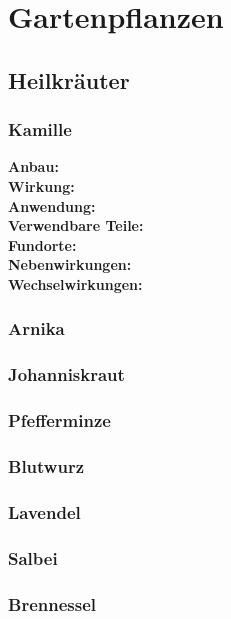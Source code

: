 \chapter{Gartenpflanzen}

\section{Heilkräuter}
\lipsum[2]

\subsection{Kamille}

\textbf{Anbau:} \\
\textbf{Wirkung:} \\
\textbf{Anwendung:} \\
\textbf{Verwendbare Teile:} \\
\textbf{Fundorte:} \\
\textbf{Nebenwirkungen:} \\
\textbf{Wechselwirkungen:}


\subsection{Arnika}

\subsection{Johanniskraut}

\subsection{Pfefferminze}

\subsection{Blutwurz}

\subsection{Lavendel}

\subsection{Salbei}

\subsection{Brennessel}

